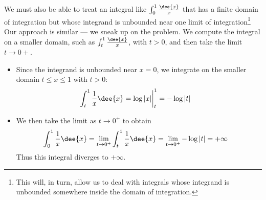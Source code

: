 We must also be able to treat an integral like $\int_0^1\frac{\dee{x}}{x}$
that has a finite domain of integration but whose integrand is unbounded
near one limit of integration\footnote{This will, in turn, allow us to
deal with integrals whose integrand is unbounded somewhere inside the domain of
integration.} Our approach is similar --- we sneak up on the problem.
We compute the integral on a smaller domain, such as $\int_t^1\frac{\dee{x}}{x}$, with
$t>0$, and then take the limit $t\rightarrow 0+$.
\begin{eg}
\soln
\begin{itemize}
 \item Since the integrand is unbounded near $x=0$, we integrate on the smaller domain
$t\leq x \leq 1$ with $t>0$:
\begin{align*}
  \int_t^1 \frac{1}{x}\dee{x}
  &= \log|x| \bigg|_t^1 = -\log|t|
\end{align*}
\item We then take the limit as $t \to 0^+$ to obtain
\begin{align*}
  \int_0^1 \frac{1}{x}\dee{x}
&= \lim_{t\to 0^+}\int_t^1 \frac{1}{x}\dee{x} = \lim_{t\to 0^+} -\log|t|
= +\infty
\end{align*}
Thus this integral diverges to $+\infty$.
\end{itemize}
\end{eg}
%


